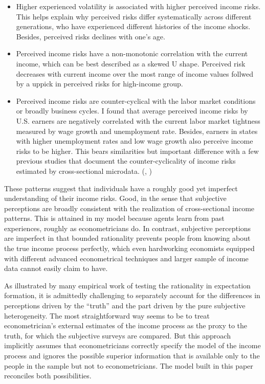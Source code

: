 \documentclass[12pt,notitlepage,onecolumn,aps,pra]{article}
\begin{document}
\begin{itemize}
\item
  Higher experienced volatility is associated with higher perceived
  income risks. This helps explain why perceived risks differ
  systematically across different generations, who have experienced
  different histories of the income shocks. Besides, perceived risks
  declines with one's age.
\item
  Perceived income risks have a non-monotonic correlation with the
  current income, which can be best described as a skewed U shape.
  Perceived risk decreases with current income over the most range of
  income values follwed by a uppick in perceived risks for high-income
  group.
\item
  Perceived income risks are counter-cyclical with the labor market
  conditions or broadly business cycles. I found that average perceived
  income risks by U.S. earners are negatively correlated with the
  current labor market tightness measured by wage growth and
  unemployment rate. Besides, earners in states with higher unemployment
  rates and low wage growth also perceive income risks to be higher.
  This bears similarities but important difference with a few previous
  studies that document the counter-cyclicality of income risks
  estimated by cross-sectional microdata. (\cite{guvenen2014nature},
  \cite{catherine_countercyclical_2019})
\end{itemize}

These patterns suggest that individuals have a roughly good yet
imperfect understanding of their income risks. Good, in the sense that
subjective perceptions are broadly consistent with the realization of
cross-sectional income patterns. This is attained in my model because
agents learn from past experiences, roughly as econometricians do. In
contrast, subjective perceptions are imperfect in that bounded
rationality prevents people from knowing about the true income process
perfectly, which even hardworking economists equipped with different
advanced econometrical techniques and larger sample of income data
cannot easily claim to have.

As illustrated by many empirical work of testing the rationality in
expectation formation, it is admittedly challenging to separately
account for the differences in perceptions driven by the ``truth'' and
the part driven by the pure subjective heterogeneity. The most
straightforward way seems to be to treat econometrician's external
estimates of the income process as the proxy to the truth, for which the
subjective surveys are compared. But this approach implicitly assumes
that econometricians correctly specify the model of the income process
and ignores the possible superior information that is available only to
the people in the sample but not to econometricians. The model built in
this paper reconciles both possibilities.
\end{document}
